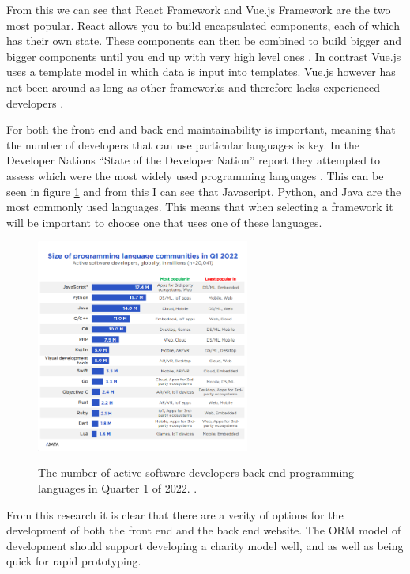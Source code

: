 \documentclass{UoYCSproject}
\begin{document}
From this we can see that React Framework and Vue.js Framework are the two most popular. React allows you to build encapsulated components, each of which has their own state. These components can then be combined to build bigger and bigger components until you end up with very high level ones \cite{react_docs}.  In contrast Vue.js uses a template model in which data is input into templates. Vue.js however has not been around as long as other frameworks and therefore lacks experienced developers \cite{goncharenko_2022}. 

For both the front end and back end maintainability is important, meaning that the number of developers that can use particular languages is key. In the Developer Nations “State of the Developer Nation” report they attempted to assess which were the most widely used programming languages \cite{korakitis_muir_jones_condon}. This can be seen in figure \ref{fig:developer_nation} and from this I can see that Javascript, Python, and Java are the most commonly used languages. This means that when selecting a framework it will be important to choose one that uses one of these languages. 

\begin{figure}[htb]
\begin{center}
\includegraphics[height=7cm]{"./assets/lit-review-assets/developer_nation_programming_languages"}
\label{fig:developer_nation}
\end{center}
\caption{The number of active software developers back end programming languages in Quarter 1 of 2022. \protect\cite{korakitis_muir_jones_condon}.}
\end{figure}

From this research it is clear that there are a verity of options for the development of both the front end and the back end website. The ORM model of development should support developing a charity model well, and as well as being quick for rapid prototyping. 
\end{document}
